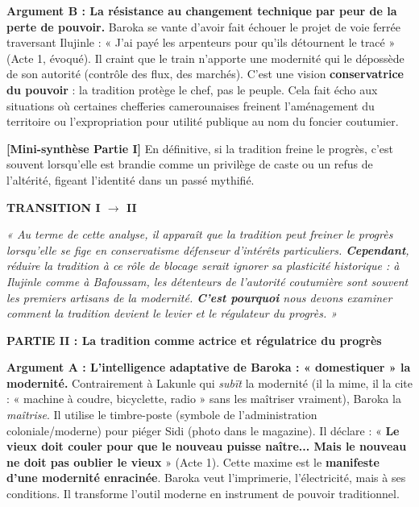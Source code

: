 \documentclass[11pt]{article}
\begin{document}
\begin{exoresolu}
\noindent \textbf{Argument B : La résistance au changement technique par peur de la perte de pouvoir.}
Baroka se vante d'avoir fait échouer le projet de voie ferrée traversant Ilujinle : « J'ai payé les arpenteurs pour qu'ils détournent le tracé » (Acte 1, évoqué). Il craint que le train n'apporte une modernité qui le dépossède de son autorité (contrôle des flux, des marchés). C'est une vision \textbf{conservatrice du pouvoir} : la tradition protège le chef, pas le peuple. Cela fait écho aux situations où certaines chefferies camerounaises freinent l'aménagement du territoire ou l'expropriation pour utilité publique au nom du foncier coutumier.

\noindent \textbf{[Mini-synthèse Partie I]} En définitive, si la tradition freine le progrès, c'est souvent lorsqu'elle est brandie comme un privilège de caste ou un refus de l'altérité, figeant l'identité dans un passé mythifié.

\medskip
\noindent \textbf{TRANSITION I $\rightarrow$ II}
\begin{center}
    \textit{« Au terme de cette analyse, il apparaît que la tradition peut freiner le progrès lorsqu'elle se fige en conservatisme défenseur d'intérêts particuliers. \textbf{Cependant}, réduire la tradition à ce rôle de blocage serait ignorer sa plasticité historique : à Ilujinle comme à Bafoussam, les détenteurs de l'autorité coutumière sont souvent les premiers artisans de la modernité. \textbf{C'est pourquoi} nous devons examiner comment la tradition devient le levier et le régulateur du progrès. »}
\end{center}

\medskip
\noindent \textbf{PARTIE II : La tradition comme actrice et régulatrice du progrès}

\noindent \textbf{Argument A : L'intelligence adaptative de Baroka : « domestiquer » la modernité.}
Contrairement à Lakunle qui \emph{subït} la modernité (il la mime, il la cite : « machine à coudre, bicyclette, radio » sans les maîtriser vraiment), Baroka la \emph{maîtrise}. Il utilise le timbre-poste (symbole de l'administration coloniale/moderne) pour piéger Sidi (photo dans le magazine). Il déclare : « \textbf{Le vieux doit couler pour que le nouveau puisse naître... Mais le nouveau ne doit pas oublier le vieux} » (Acte 1). Cette maxime est le \textbf{manifeste d'une modernité enracinée}. Baroka veut l'imprimerie, l'électricité, mais à ses conditions. Il transforme l'outil moderne en instrument de pouvoir traditionnel.


\end{exoresolu}
\end{document}
